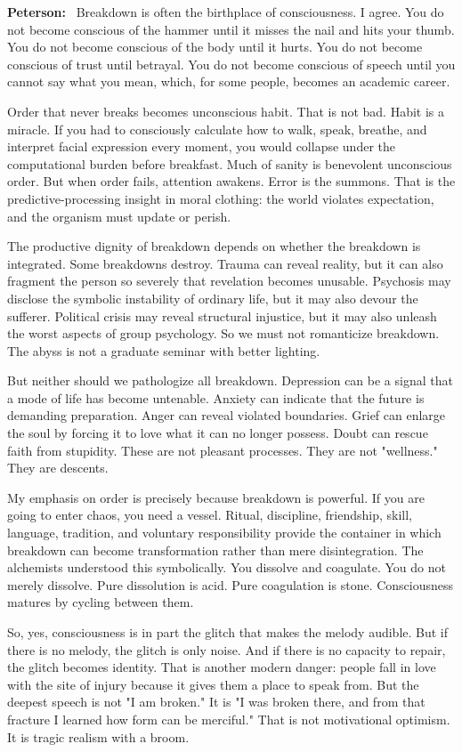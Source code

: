\documentclass[a4paper,11pt]{article}
\newenvironment{answer}{\par\noindent\color{black}\textbf{Peterson:}\ }{\par}
\begin{document}
\begin{answer}
Breakdown is often the birthplace of consciousness. I agree. You do not become conscious of the hammer until it misses the nail and hits your thumb. You do not become conscious of the body until it hurts. You do not become conscious of trust until betrayal. You do not become conscious of speech until you cannot say what you mean, which, for some people, becomes an academic career.

Order that never breaks becomes unconscious habit. That is not bad. Habit is a miracle. If you had to consciously calculate how to walk, speak, breathe, and interpret facial expression every moment, you would collapse under the computational burden before breakfast. Much of sanity is benevolent unconscious order. But when order fails, attention awakens. Error is the summons. That is the predictive-processing insight in moral clothing: the world violates expectation, and the organism must update or perish.

The productive dignity of breakdown depends on whether the breakdown is integrated. Some breakdowns destroy. Trauma can reveal reality, but it can also fragment the person so severely that revelation becomes unusable. Psychosis may disclose the symbolic instability of ordinary life, but it may also devour the sufferer. Political crisis may reveal structural injustice, but it may also unleash the worst aspects of group psychology. So we must not romanticize breakdown. The abyss is not a graduate seminar with better lighting.

But neither should we pathologize all breakdown. Depression can be a signal that a mode of life has become untenable. Anxiety can indicate that the future is demanding preparation. Anger can reveal violated boundaries. Grief can enlarge the soul by forcing it to love what it can no longer possess. Doubt can rescue faith from stupidity. These are not pleasant processes. They are not "wellness." They are descents.

My emphasis on order is precisely because breakdown is powerful. If you are going to enter chaos, you need a vessel. Ritual, discipline, friendship, skill, language, tradition, and voluntary responsibility provide the container in which breakdown can become transformation rather than mere disintegration. The alchemists understood this symbolically. You dissolve and coagulate. You do not merely dissolve. Pure dissolution is acid. Pure coagulation is stone. Consciousness matures by cycling between them.

So, yes, consciousness is in part the glitch that makes the melody audible. But if there is no melody, the glitch is only noise. And if there is no capacity to repair, the glitch becomes identity. That is another modern danger: people fall in love with the site of injury because it gives them a place to speak from. But the deepest speech is not "I am broken." It is "I was broken there, and from that fracture I learned how form can be merciful." That is not motivational optimism. It is tragic realism with a broom.
\end{answer}
\end{document}
